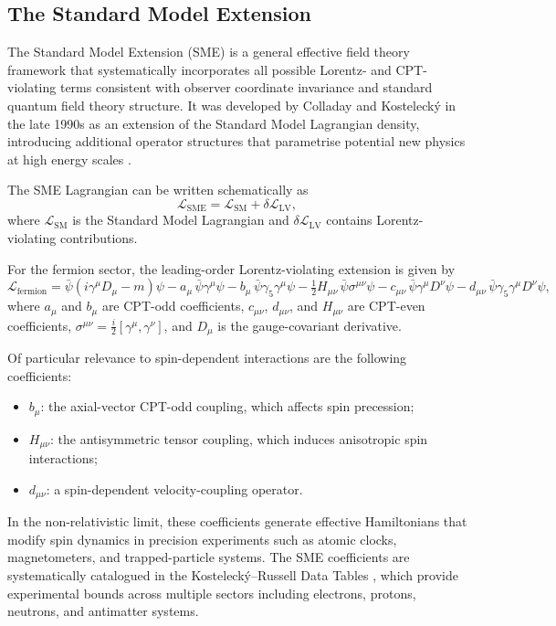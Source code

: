 \documentclass[main]{subfiles}
\begin{document}
\subsection{The Standard Model Extension}

The Standard Model Extension (SME) is a general effective field theory
framework that systematically incorporates all possible Lorentz- and
CPT-violating terms consistent with observer coordinate invariance and standard
quantum field theory structure. It was developed by Colladay and Kosteleck\'{y}
in the late 1990s as an extension of the Standard Model Lagrangian density,
introducing additional operator structures that parametrise potential new
physics at high energy scales \cite{Colladay1997,Colladay1998}.

The SME Lagrangian can be written schematically as
\begin{equation}
  \mathcal{L}_{\mathrm{SME}}
  = \mathcal{L}_{\mathrm{SM}} + \delta\mathcal{L}_{\mathrm{LV}},
\end{equation}
where $\mathcal{L}_{\mathrm{SM}}$ is the Standard Model Lagrangian and
$\delta\mathcal{L}_{\mathrm{LV}}$ contains Lorentz-violating contributions.

For the fermion sector, the leading-order Lorentz-violating extension is given
by \cite{Colladay1998}
\begin{equation}
  \mathcal{L}_{\mathrm{fermion}}
  = \bar{\psi}\!\left(i\gamma^{\mu}D_{\mu} - m\right)\psi
  - a_{\mu}\,\bar{\psi}\gamma^{\mu}\psi
  - b_{\mu}\,\bar{\psi}\gamma_{5}\gamma^{\mu}\psi
  - \tfrac{1}{2}H_{\mu\nu}\,\bar{\psi}\sigma^{\mu\nu}\psi
  - c_{\mu\nu}\,\bar{\psi}\gamma^{\mu}D^{\nu}\psi
  - d_{\mu\nu}\,\bar{\psi}\gamma_{5}\gamma^{\mu}D^{\nu}\psi,
\end{equation}
where $a_{\mu}$ and $b_{\mu}$ are CPT-odd coefficients, $c_{\mu\nu}$,
$d_{\mu\nu}$, and $H_{\mu\nu}$ are CPT-even coefficients,
$\sigma^{\mu\nu} = \tfrac{i}{2}[\gamma^{\mu},\gamma^{\nu}]$, and $D_{\mu}$ is
the gauge-covariant derivative.

Of particular relevance to spin-dependent interactions are the following
coefficients:
\begin{itemize}
  \item $b_{\mu}$: the axial-vector CPT-odd coupling, which affects spin
    precession;
  \item $H_{\mu\nu}$: the antisymmetric tensor coupling, which induces
    anisotropic spin interactions;
  \item $d_{\mu\nu}$: a spin-dependent velocity-coupling operator.
\end{itemize}
In the non-relativistic limit, these coefficients generate effective
Hamiltonians that modify spin dynamics in precision experiments such as atomic
clocks, magnetometers, and trapped-particle systems. The SME coefficients are
systematically catalogued in the Kosteleck\'{y}--Russell Data Tables
\cite{Kostelecky2011}, which provide experimental bounds across multiple sectors
including electrons, protons, neutrons, and antimatter systems.
\end{document}
